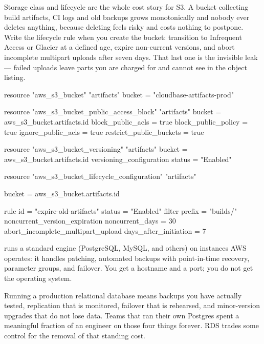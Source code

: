 \begin{costnote}
Storage class and lifecycle are the whole cost story for S3. A bucket collecting build artifacts, CI logs and old backups grows monotonically and nobody ever deletes anything, because deleting feels risky and costs nothing to postpone. Write the lifecycle rule when you create the bucket: transition to Infrequent Access or Glacier at a defined age, expire non-current versions, and abort incomplete multipart uploads after seven days. That last one is the invisible leak --- failed uploads leave parts you are charged for and cannot see in the object listing.
\end{costnote}

\begin{tfbox}
resource "aws_s3_bucket" "artifacts" {
  bucket = "cloudbase-artifacts-prod"
}

resource "aws_s3_bucket_public_access_block" "artifacts" {
  bucket                  = aws_s3_bucket.artifacts.id
  block_public_acls       = true
  block_public_policy     = true
  ignore_public_acls      = true
  restrict_public_buckets = true
}

resource "aws_s3_bucket_versioning" "artifacts" {
  bucket = aws_s3_bucket.artifacts.id
  versioning_configuration { status = "Enabled" }
}

resource "aws_s3_bucket_lifecycle_configuration" "artifacts" {
  bucket = aws_s3_bucket.artifacts.id

  rule {
    id     = "expire-old-artifacts"
    status = "Enabled"
    filter { prefix = "builds/" }
    noncurrent_version_expiration { noncurrent_days = 30 }
    abort_incomplete_multipart_upload { days_after_initiation = 7 }
  }
}
\end{tfbox}


  runs a standard engine (PostgreSQL, MySQL, and others) on instances AWS operates: it handles patching, automated backups with point-in-time recovery, parameter groups, and failover. You get a hostname and a port; you do not get the operating system.

 Running a production relational database means backups you have actually tested, replication that is monitored, failover that is rehearsed, and minor-version upgrades that do not lose data. Teams that ran their own Postgres spent a meaningful fraction of an engineer on those four things forever. RDS trades some control for the removal of that standing cost.

